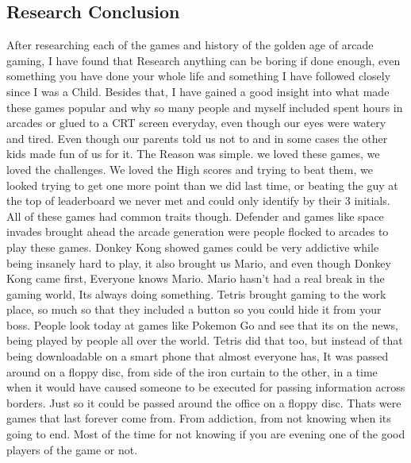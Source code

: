 \documentclass{article}
\begin{document}
\subsection{Research Conclusion}
After researching each of the games and history of the golden age of arcade gaming, I have found that Research anything can be boring if done enough, even something you have done your whole life and something I have followed closely since I was a Child. Besides that, I have gained a good insight into what made these games popular and why so many people and myself included spent hours in arcades or glued to a CRT screen everyday, even though our eyes were watery and tired. Even though our parents told us not to and in some cases the other kids made fun of us for it. \newline
The Reason was simple. we loved these games, we loved the challenges. We loved the High scores and trying to beat them, we looked trying to get one more point than we did last time, or beating the guy at the top of leaderboard we never met and could only identify by their 3 initials. All of these games had common traits though. Defender and games like space invades brought ahead the arcade generation were people flocked to arcades to play these games. Donkey Kong showed games could be very addictive while being insanely hard to play, it also brought us Mario, and even though Donkey Kong came first, Everyone knows Mario. Mario hasn't had a real break in the gaming world, Its always doing something. Tetris brought gaming to the work place, so much so that they included a button so you could hide it from your boss. People look today at games like Pokemon Go and see that its on the news, being played by people all over the world. Tetris did that too, but instead of that being downloadable on a smart phone that almost everyone has, It was passed around on a floppy disc, from side of the iron curtain to the other, in a time when it would have caused someone to be executed for passing information across borders. Just so it could be passed around the office on a floppy disc. Thats were games that last forever come from. From addiction, from not knowing when its going to end. Most of the  time for not knowing if you are evening one of the good players of the game or not. 
\clearpage
\end{document}
